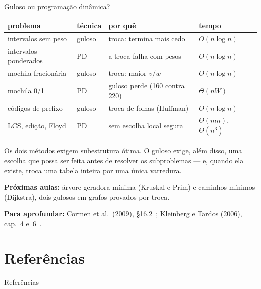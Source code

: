 \documentclass[aspectratio=169,xcolor=table]{beamer}
\newcommand{\fonte}[1]{%
  \vfill
  {\tiny\color{gray!55!black}\textbf{Para aprofundar:} #1\par}%
}
\begin{document}
\begin{frame}{Guloso ou programação dinâmica?}
  \begin{center}
  \scriptsize
  \begin{tabular}{llll}
    \toprule
    problema & técnica & por quê & tempo \\
    \midrule
    intervalos sem peso & guloso & troca: termina mais cedo & $O(n \log n)$ \\
    intervalos ponderados & PD & a troca falha com pesos & $O(n \log n)$ \\
    mochila fracionária & guloso & troca: maior $v/w$ & $O(n \log n)$ \\
    mochila 0/1 & PD & guloso perde (160 contra 220) & $\Theta(nW)$ \\
    códigos de prefixo & guloso & troca de folhas (Huffman) & $O(n \log n)$ \\
    LCS, edição, Floyd & PD & sem escolha local segura & $\Theta(mn)$, $\Theta(n^3)$ \\
    \bottomrule
  \end{tabular}
  \end{center}
  \medskip
  {\scriptsize Os dois métodos exigem subestrutura ótima. O guloso exige, além disso, uma
  escolha que possa ser feita antes de resolver os subproblemas --- e, quando ela existe,
  troca uma tabela inteira por uma única varredura.\par}
  \smallskip
  {\scriptsize\textbf{Próximas aulas:} árvore geradora mínima (Kruskal e Prim) e caminhos
  mínimos (Dijkstra), dois gulosos em grafos provados por troca.\par}
  \fonte{Cormen et al.\ (2009), \S 16.2~\cite{cormen2009introduction};
    Kleinberg e Tardos (2006), cap.~4 e~6~\cite{kleinberg2006algorithm}.}
\end{frame}

\section*{Referências}
\begin{frame}[allowframebreaks]{Referências}
  \tiny
  \nocite{cormen2009introduction,cormen2012algoritmos,kleinberg2006algorithm,levitin2012introduction,dasgupta2008algorithms,huffman1952method,shannon1948mathematical,cover2006elements,vanleeuwen1976construction,deutsch1996deflate}
  
  
\end{frame}
\end{document}

